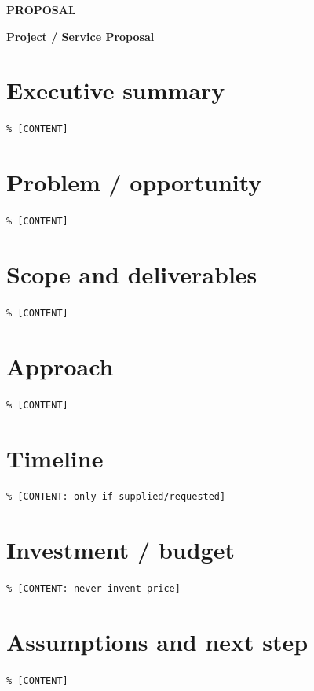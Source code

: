 \documentclass[11pt,a4paper]{scrreprt}
\begin{document}
{\small\sffamily\bfseries\color{Accent} PROPOSAL\par}{\Huge\bfseries Project / Service Proposal\par}\vspace{1.5em}
\section*{Executive summary}\texttt{\% [CONTENT]}
\section*{Problem / opportunity}\texttt{\% [CONTENT]}
\section*{Scope and deliverables}\texttt{\% [CONTENT]}
\section*{Approach}\texttt{\% [CONTENT]}
\section*{Timeline}\texttt{\% [CONTENT: only if supplied/requested]}
\section*{Investment / budget}\texttt{\% [CONTENT: never invent price]}
\section*{Assumptions and next step}\texttt{\% [CONTENT]}
\end{document}
